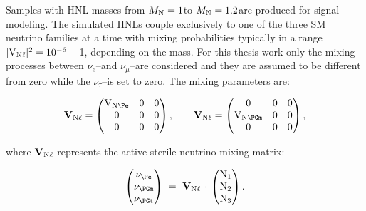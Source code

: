 Samples with HNL masses from 
$M_{\mathrm{N}} = 1$\GeV to $M_{\mathrm{N}} = 1.2$\TeV are produced for signal
modeling.
The simulated HNLs couple
exclusively to one of the three SM neutrino families at a time with 
mixing probabilities typically in a range $\mathrm{|V_{\mathrm{N}\ell}|^2} = 10^{-6}$ -- 1,
depending on the mass. For this thesis work only the mixing processes between
$\nu_e$--\hnl and $\nu_{\mu}$--\hnl are considered and they are
assumed to be different from zero while the
$\nu_{\tau}$--\hnl is set to zero. The mixing parameters are:
\begin{linenomath}
\begin{equation}
  \mathbf{V}_{\hnl\ell} =
  \begin{pmatrix}
    \mathrm{V}_{\hnl\Pe} & 0 & 0 \\
    0                   & 0 & 0 \\
    0                   & 0 & 0 \\
  \end{pmatrix},
\quad\quad
  \mathbf{V}_{\hnl\ell} =
  \begin{pmatrix}
    0                    & 0 & 0 \\
    \mathrm{V}_{\hnl\PGm} & 0 & 0 \\
    0                    & 0 & 0 \\
  \end{pmatrix},
\end{equation}
\end{linenomath}
where $\mathbf{V}_{\mathrm{N}\ell}$ represents the active-sterile neutrino
mixing matrix:
\begin{linenomath}
\begin{equation}
  \begin{pmatrix}
    \nu_{\Pe}  \\
    \nu_{\PGm} \\
    \nu_{\PGt} \\
  \end{pmatrix} ~=~
  \mathbf{V}_{\hnl\ell}\,\cdot\,
  \begin{pmatrix}
    \hnl_{1} \\
    \hnl_{2} \\
    \hnl_{3} \\
  \end{pmatrix}.
\end{equation}
\end{linenomath}

